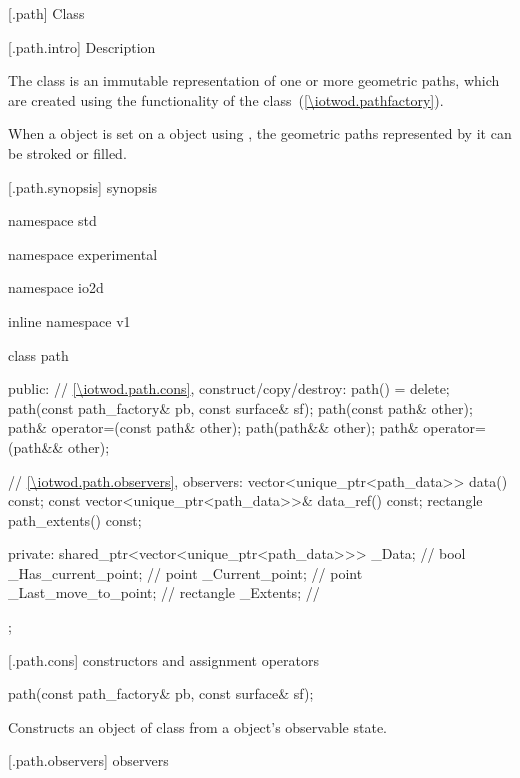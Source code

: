  [\iotwod.path] {Class }

 [\iotwod.path.intro] { Description}

\pnum
{}%
The  class is an immutable representation of one or 
more geometric paths, which are created using the functionality of the 
 class~(\ref{\iotwod.pathfactory}).

\pnum
When a  object is set on a  object using 
, the geometric paths represented by it can be 
stroked or filled.

 [\iotwod.path.synopsis] { synopsis}

\begin{codeblock}
namespace std { namespace experimental { namespace io2d { inline namespace v1 {
  class path {
    public:
    // \ref{\iotwod.path.cons}, construct/copy/destroy:
    path() = delete;
    path(const path_factory& pb, const surface& sf);
    path(const path& other);
    path& operator=(const path& other);
    path(path&& other);
    path& operator=(path&& other);

    // \ref{\iotwod.path.observers}, observers:
    vector<unique_ptr<path_data>> data() const;
    const vector<unique_ptr<path_data>>& data_ref() const;
    rectangle path_extents() const;
    
  private:
    shared_ptr<vector<unique_ptr<path_data>>> _Data; // \expos
    bool _Has_current_point;                         // \expos
    point _Current_point;                            // \expos
    point _Last_move_to_point;                       // \expos
    rectangle _Extents;                              // \expos
  };
} } } }
\end{codeblock}

 [\iotwod.path.cons] { constructors and assignment operators}

\begin{itemdecl}
	path(const path_factory& pb, const surface& sf);
\end{itemdecl}
\begin{itemdescr}
	\pnum
	\effects
	Constructs an object of class  from a  
	object's observable state.
\end{itemdescr}

 [\iotwod.path.observers] { observers}

